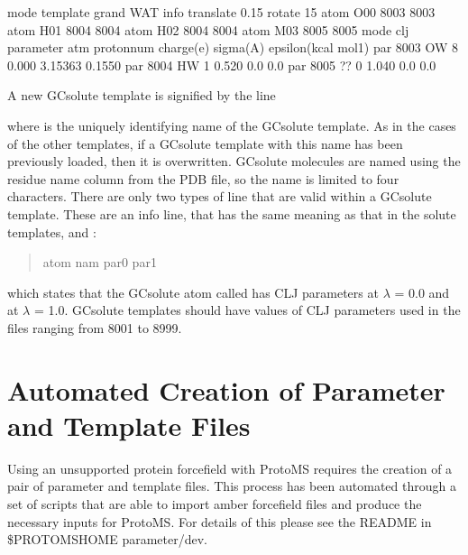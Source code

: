 \documentclass[letterpaper,10pt,english]{sphinxmanual}
\begin{document}
%
\begin{sphinxVerbatim}[commandchars=\\\{\}]
mode template
grand WAT
info translate 0.15 rotate 15
atom   O00  8003 8003
atom   H01  8004 8004
atom   H02  8004 8004
atom   M03  8005 8005
mode clj
\PYGZsh{}parameter atm proton\PYGZhy{}num charge(\textbar{}e\textbar{}) sigma(A) epsilon(kcal mol\PYGZhy{}1)
par  8003   OW    8    0.000      3.15363    0.1550
par  8004   HW    1    0.520      0.0        0.0
par  8005   ??    0   \PYGZhy{}1.040      0.0        0.0
\end{sphinxVerbatim}

A new GCsolute template is signified by the line

%
\begin{sphinxVerbatim}[commandchars=\\\{\}]
 
\end{sphinxVerbatim}

where  is the uniquely identifying name of the GCsolute template. As in the cases of the other templates, if a GCsolute template with this name has been previously loaded, then it is overwritten. GCsolute molecules are named using the residue name column from the PDB file, so the name is limited to four characters. There are only two types of line that are valid within a GCsolute template. These are an info line, that has the same meaning as that in the solute templates, and :
\begin{quote}

atom nam par0 par1
\end{quote}

which states that the GCsolute atom called  has CLJ parameters  at \(\lambda\)  = 0.0 and  at \(\lambda\) = 1.0. GCsolute templates should have values of CLJ parameters used in the files ranging from 8001 to 8999.


\section{Automated Creation of Parameter and Template Files}
\label{\detokenize{protoms:automated-creation-of-parameter-and-template-files}}
Using an unsupported protein forcefield with ProtoMS requires the creation of a pair of parameter and template files. This process has been automated through a set of scripts that are able to import amber forcefield files and produce the necessary inputs for ProtoMS. For details of this please see the README in \$PROTOMSHOME parameter/dev.
\end{document}
